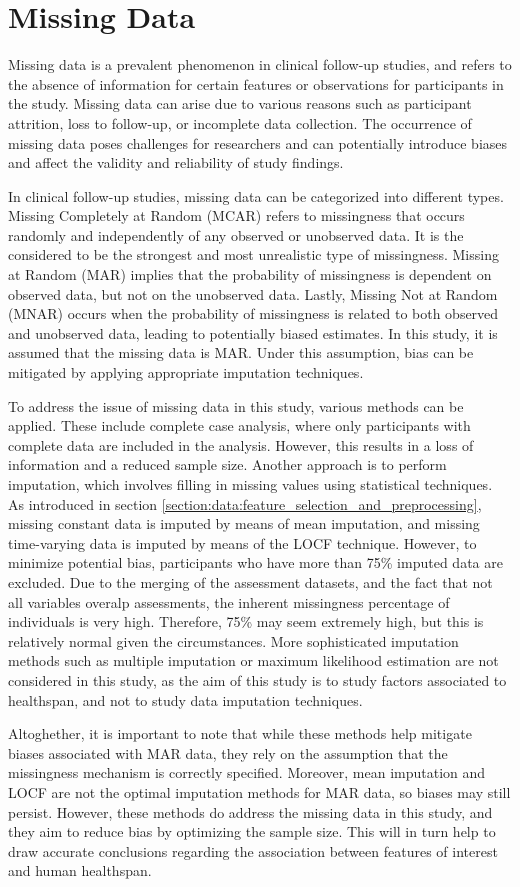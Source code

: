 \section{Missing Data}
\label{section:data:missing_data}
Missing data is a prevalent phenomenon in clinical follow-up studies, and refers to the absence of information for certain features or observations for participants in the study. Missing data can arise due to various reasons such as participant attrition, loss to follow-up, or incomplete data collection. The occurrence of missing data poses challenges for researchers and can potentially introduce biases and affect the validity and reliability of study findings.

In clinical follow-up studies, missing data can be categorized into different types. Missing Completely at Random (MCAR) refers to missingness that occurs randomly and independently of any observed or unobserved data. It is the considered to be the strongest and most unrealistic type of missingness. Missing at Random (MAR) implies that the probability of missingness is dependent on observed data, but not on the unobserved data. Lastly, Missing Not at Random (MNAR) occurs when the probability of missingness is related to both observed and unobserved data, leading to potentially biased estimates. In this study, it is assumed that the missing data is MAR. Under this assumption, bias can be mitigated by applying appropriate imputation techniques. 

To address the issue of missing data in this study, various methods can be applied. These include complete case analysis, where only participants with complete data are included in the analysis. However, this results in a loss of information and a reduced sample size. Another approach is to perform imputation, which involves filling in missing values using statistical techniques. As introduced in section \ref{section:data:feature_selection_and_preprocessing}, missing constant data is imputed by means of mean imputation, and missing time-varying data is imputed by means of the LOCF technique. However, to minimize potential bias, participants who have more than 75\% imputed data are excluded. Due to the merging of the assessment datasets, and the fact that not all variables overalp assessments, the inherent missingness percentage of individuals is very high. Therefore, 75\% may seem extremely high, but this is relatively normal given the circumstances. More sophisticated imputation methods such as multiple imputation or maximum likelihood estimation are not considered in this study, as the aim of this study is to study factors associated to healthspan, and not to study data imputation techniques.  

Altoghether, it is important to note that while these methods help mitigate biases associated with MAR data, they rely on the assumption that the missingness mechanism is correctly specified. Moreover, mean imputation and LOCF are not the optimal imputation methods for MAR data, so biases may still persist. However, these methods do address the missing data in this study, and they aim to reduce bias by optimizing the sample size. This will in turn help to draw accurate conclusions regarding the association between features of interest and human healthspan. 